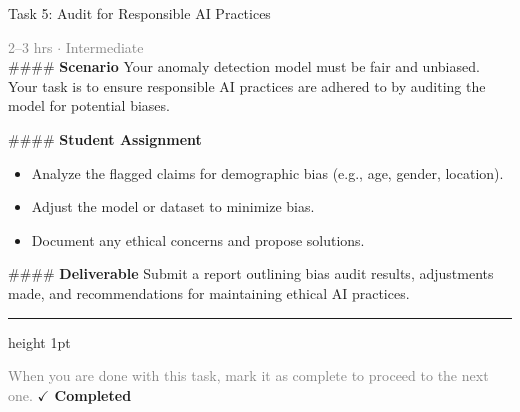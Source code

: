 \documentclass[10pt,a4paper]{article}
\begin{document}
\begin{taskbox}{Task 5: Audit for Responsible AI Practices}

    {\small \textcolor{gray}{2--3 hrs $\cdot$ Intermediate}}\\[12pt]

    \#\#\#\# \textbf{Scenario}  
Your anomaly detection model must be fair and unbiased. Your task is to ensure responsible AI practices are adhered to by auditing the model for potential biases.  

\#\#\#\# \textbf{Student Assignment}  
\begin{itemize}
    \item Analyze the flagged claims for demographic bias (e.g., age, gender, location).  
    \item Adjust the model or dataset to minimize bias.  
    \item Document any ethical concerns and propose solutions.  
\end{itemize}

\#\#\#\# \textbf{Deliverable}  
Submit a report outlining bias audit results, adjustments made, and recommendations for maintaining ethical AI practices.\par

    \vspace{16pt}

    \textcolor{cardBorder}{\hrule height 1pt}\vspace{8pt}

    \small \textcolor{gray}{When you are done with this task, mark it as complete to proceed to the next one.} \hfill \textbf{\textcolor{brandDark}{$\checkmark$ Completed}}

\end{taskbox}
\end{document}
